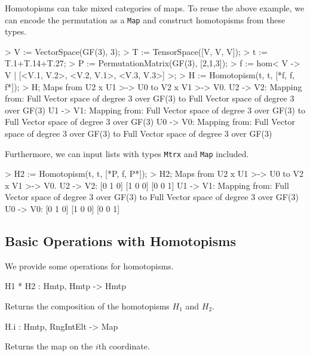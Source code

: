 \begin{example}[MixedHomotopisms]
Homotopisms can take mixed categories of maps.
To reuse the above example, we can encode the permutation as a \texttt{Map} and construct homotopisms from these types.
\begin{code}
> V := VectorSpace(GF(3), 3);
> T := TensorSpace([V, V, V]);
> t := T.1+T.14+T.27;
> P := PermutationMatrix(GF(3), [2,1,3]);
> f := hom< V -> V | [<V.1, V.2>, <V.2, V.1>, <V.3, V.3>] >;
> H := Homotopism(t, t, [*f, f, f*]);
> H;
Maps from U2 x U1 >-> U0 to V2 x V1 >-> V0.
U2 -> V2: Mapping from: Full Vector space of degree 3 over GF(3) to Full 
Vector space of degree 3 over GF(3)
U1 -> V1: Mapping from: Full Vector space of degree 3 over GF(3) to Full 
Vector space of degree 3 over GF(3)
U0 -> V0: Mapping from: Full Vector space of degree 3 over GF(3) to Full 
Vector space of degree 3 over GF(3)
\end{code}

Furthermore, we can input lists with types \texttt{Mtrx} and \texttt{Map} included.
\begin{code}
> H2 := Homotopism(t, t, [*P, f, P*]);
> H2;
Maps from U2 x U1 >-> U0 to V2 x V1 >-> V0.
U2 -> V2: 
[0 1 0]
[1 0 0]
[0 0 1]
U1 -> V1: Mapping from: Full Vector space of degree 3 over GF(3) to Full 
Vector space of degree 3 over GF(3)
U0 -> V0: 
[0 1 0]
[1 0 0]
[0 0 1]
\end{code}
\end{example}


\subsection{Basic Operations with Homotopisms}

We provide some operations for homotopisms.

\begin{intrinsics}
H1 * H2 : Hmtp, Hmtp -> Hmtp
\end{intrinsics}

Returns the composition of the homotopisms $H_1$ and $H_2$.

\begin{intrinsics}
H.i : Hmtp, RngIntElt -> Map
\end{intrinsics}

Returns the map on the $i$th coordinate.

